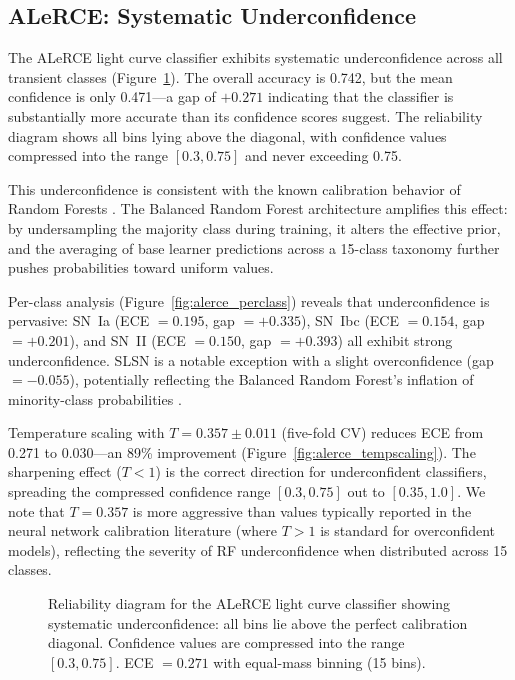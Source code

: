 \documentclass[twocolumn]{aastex631}
\begin{document}
\subsection{ALeRCE: Systematic Underconfidence} \label{sec:alerce}

The ALeRCE light curve classifier exhibits systematic underconfidence across all transient classes (Figure~\ref{fig:alerce_reliability}). The overall accuracy is 0.742, but the mean confidence is only 0.471---a gap of $+0.271$ indicating that the classifier is substantially more accurate than its confidence scores suggest. The reliability diagram shows all bins lying above the diagonal, with confidence values compressed into the range $[0.3, 0.75]$ and never exceeding 0.75.

This underconfidence is consistent with the known calibration behavior of Random Forests \citep{niculescumizil2005, bostrom2008}. The Balanced Random Forest architecture amplifies this effect: by undersampling the majority class during training, it alters the effective prior, and the averaging of base learner predictions across a 15-class taxonomy further pushes probabilities toward uniform values.

Per-class analysis (Figure~\ref{fig:alerce_perclass}) reveals that underconfidence is pervasive: SN~Ia (ECE $= 0.195$, gap $= +0.335$), SN~Ibc (ECE $= 0.154$, gap $= +0.201$), and SN~II (ECE $= 0.150$, gap $= +0.393$) all exhibit strong underconfidence. SLSN is a notable exception with a slight overconfidence (gap $= -0.055$), potentially reflecting the Balanced Random Forest's inflation of minority-class probabilities \citep{vandengoorbergh2022}.

Temperature scaling with $T = 0.357 \pm 0.011$ (five-fold CV) reduces ECE from 0.271 to 0.030---an 89\% improvement (Figure~\ref{fig:alerce_tempscaling}). The sharpening effect ($T < 1$) is the correct direction for underconfident classifiers, spreading the compressed confidence range $[0.3, 0.75]$ out to $[0.35, 1.0]$. We note that $T = 0.357$ is more aggressive than values typically reported in the neural network calibration literature (where $T > 1$ is standard for overconfident models), reflecting the severity of RF underconfidence when distributed across 15 classes.

\begin{figure}
\caption{Reliability diagram for the ALeRCE light curve classifier showing systematic underconfidence: all bins lie above the perfect calibration diagonal. Confidence values are compressed into the range $[0.3, 0.75]$. ECE $= 0.271$ with equal-mass binning (15 bins). \label{fig:alerce_reliability}}
\end{figure}
\end{document}
